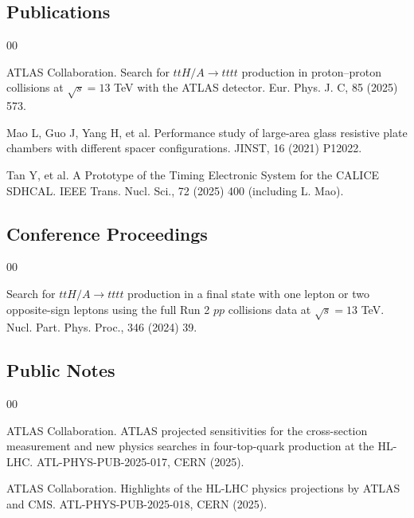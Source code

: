 ﻿%

\begin{achievements}

\subsection*{Publications}

\begin{bibliolist}{00}
  \item ATLAS Collaboration. Search for $ttH/A \to tttt$ production in proton--proton collisions at $\sqrt{s}=13$ TeV with the ATLAS detector. Eur. Phys. J. C, 85 (2025) 573.
  \item Mao L, Guo J, Yang H, et al. Performance study of large-area glass resistive plate chambers with different spacer configurations. JINST, 16 (2021) P12022.
  \item Tan Y, et al. A Prototype of the Timing Electronic System for the CALICE SDHCAL. IEEE Trans. Nucl. Sci., 72 (2025) 400 (including L. Mao).
\end{bibliolist}

\subsection*{Conference Proceedings}

\begin{bibliolist}{00}
  \item Search for $ttH/A \to tttt$ production in a final state with one lepton or two opposite-sign leptons using the full Run 2 $pp$ collisions data at $\sqrt{s}=13$ TeV. Nucl. Part. Phys. Proc., 346 (2024) 39.
\end{bibliolist}

\subsection*{Public Notes}

\begin{bibliolist}{00}
  \item ATLAS Collaboration. ATLAS projected sensitivities for the cross-section measurement and new physics searches in four-top-quark production at the HL-LHC. ATL-PHYS-PUB-2025-017, CERN (2025).
  \item ATLAS Collaboration. Highlights of the HL-LHC physics projections by ATLAS and CMS. ATL-PHYS-PUB-2025-018, CERN (2025).
\end{bibliolist}


\end{achievements}
